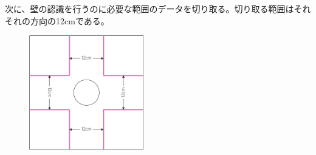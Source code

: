 \documentclass[uplatex,dvipdfmx,a4paper]{jsarticle}
\begin{document}
    \noindent
    次に、壁の認識を行うのに必要な範囲のデータを切り取る。切り取る範囲はそれそれの方向の12cmである。
    \begin{figure}[H]
      \centering
      \includegraphics[width=50mm]{Photo/image2.drawio.png}
      \caption{}
    \end{figure}
    
\end{document}
